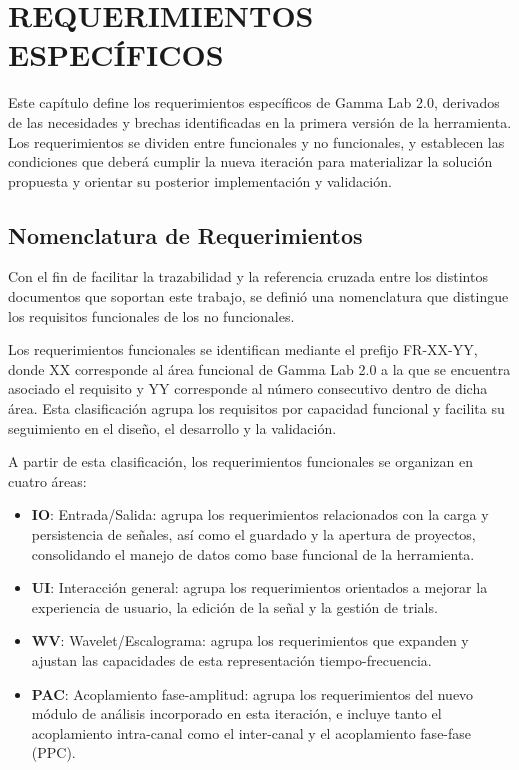 \documentclass[12pt, letterpaper]{article}
\begin{document}
\newpage
\section{REQUERIMIENTOS ESPECÍFICOS}

Este capítulo define los requerimientos específicos de Gamma Lab 2.0, derivados de las necesidades y brechas identificadas en la primera versión de la herramienta. Los requerimientos se dividen entre funcionales y no funcionales, y establecen las condiciones que deberá cumplir la nueva iteración para materializar la solución propuesta y orientar su posterior implementación y validación.

\subsection{Nomenclatura de Requerimientos}
\label{sec:Nomenclatura de Requerimientos}

Con el fin de facilitar la trazabilidad y la referencia cruzada entre los distintos documentos que soportan este trabajo, se definió una nomenclatura que distingue los requisitos funcionales de los no funcionales.

Los requerimientos funcionales se identifican mediante el prefijo FR-XX-YY, donde XX corresponde al área funcional de Gamma Lab 2.0 a la que se encuentra asociado el requisito y YY corresponde al número consecutivo dentro de dicha área. Esta clasificación agrupa los requisitos por capacidad funcional y facilita su seguimiento en el diseño, el desarrollo y la validación.

A partir de esta clasificación, los requerimientos funcionales se organizan en cuatro áreas:

\begin{itemize}
    \item \textbf{IO}: Entrada/Salida: agrupa los requerimientos relacionados con la carga y persistencia de señales, así como el guardado y la apertura de proyectos, consolidando el manejo de datos como base funcional de la herramienta.
    \item \textbf{UI}: Interacción general: agrupa los requerimientos orientados a mejorar la experiencia de usuario, la edición de la señal y la gestión de trials.
    \item \textbf{WV}: Wavelet/Escalograma: agrupa los requerimientos que expanden y ajustan las capacidades de esta representación tiempo-frecuencia.
    \item \textbf{PAC}: Acoplamiento fase-amplitud: agrupa los requerimientos del nuevo módulo de análisis incorporado en esta iteración, e incluye tanto el acoplamiento intra-canal como el inter-canal y el acoplamiento fase-fase (PPC).
\end{itemize}
\end{document}
